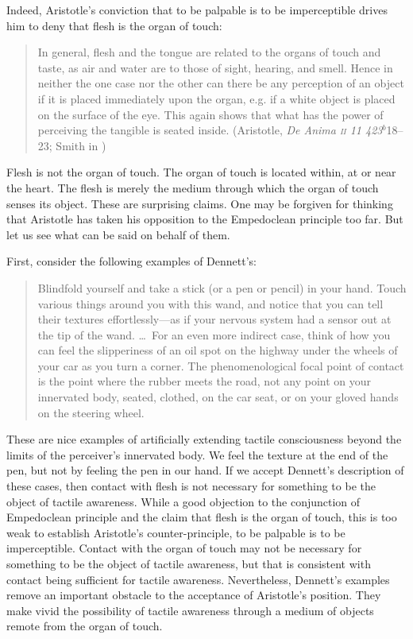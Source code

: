 Indeed, Aristotle's conviction that to be palpable is to be imperceptible drives him to deny that flesh is the organ of touch:
\begin{quote}
    In general, flesh and the tongue are related to the organs of touch and taste, as air and water are to those of sight, hearing, and smell. Hence in neither the one case nor the other can there be any perception of an object if it is placed immediately upon the organ, e.g. if a white object is placed on the surface of the eye. This again shows that what has the power of perceiving the tangible is seated inside. (Aristotle, \emph{De Anima \textsc{ii} 11 423\( ^{b} \)}18--23; Smith in \citealt[42]{Barnes:1984uq})
\end{quote}
Flesh is not the organ of touch. The organ of touch is located within, at or near the heart. The flesh is merely the medium through which the organ of touch senses its object. These are surprising claims. One may be forgiven for thinking that Aristotle has taken his opposition to the Empedoclean principle too far. But let us see what can be said on behalf of them.

First, consider the following examples of Dennett's:
\begin{quote}
    Blindfold yourself and take a stick (or a pen or pencil) in your hand. Touch various things around you with this wand, and notice that you can tell their textures effortlessly---as if your nervous system had a sensor out at the tip of the wand. \ldots\ For an even more indirect case, think of how you can feel the slipperiness of an oil spot on the highway under the wheels of your car as you turn a corner. The phenomenological focal point of contact is the point where the rubber meets the road, not any point on your innervated body, seated, clothed, on the car seat, or on your gloved hands on the steering wheel. \citep[47]{Dennett:1993ce}
\end{quote}
These are nice examples of artificially extending tactile consciousness beyond the limits of the perceiver's innervated body. We feel the texture at the end of the pen, but not by feeling the pen in our hand. If we accept Dennett's description of these cases, then contact with flesh is not necessary for something to be the object of tactile awareness. While a good objection to the conjunction of Empedoclean principle and the claim that flesh is the organ of touch, this is too weak to establish Aristotle's counter-principle, to be palpable is to be imperceptible. Contact with the organ of touch may not be necessary for something to be the object of tactile awareness, but that is consistent with contact being sufficient for tactile awareness. Nevertheless, Dennett's examples remove an important obstacle to the acceptance of Aristotle's position. They make vivid the possibility of tactile awareness through a medium of objects remote from the organ of touch.

